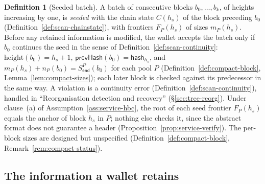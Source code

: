 \documentclass[11pt,a4paper]{article}
\theoremstyle{definition}
\newtheorem{definition}[theorem]{Definition}
\begin{document}
\begin{definition}[Seeded batch]\label{def:tree-seeded}
A batch of consecutive blocks $b_0, \dots, b_k$, of heights increasing by
one, is \emph{seeded} with the chain state $C(h_s)$ of the block preceding
$b_0$ (Definition~\ref{def:scan-chainstate}), with frontiers $F_P(h_s)$ of
sizes $m_P(h_s)$. Before any retained information is modified, the wallet
accepts the batch only if $b_0$ continues the seed in the sense of
Definition~\ref{def:scan-continuity}: $\mathrm{height}(b_0) = h_s + 1$,
$\mathsf{prevHash}(b_0) = \mathsf{hash}_{h_s}$, and
$m_P(h_s) + n_P(b_0) = S^{P}_{\mathsf{end}}(b_0)$ for each pool $P$
(Definition~\ref{def:compact-block}, Lemma~\ref{lem:compact-sizes}); each
later block is checked against its predecessor in the same way. A
violation is a continuity error (Definition~\ref{def:scan-continuity}),
handled in ``Reorganisation detection and recovery''
(\S\ref{sec:tree-reorg}). Under clause~(a) of
Assumption~\ref{ass:service-hbc}, the root of each seed frontier $F_P(h_s)$
equals the anchor of block $h_s$ in $P$; nothing else checks it, since the
abstract format does not guarantee a header
(Proposition~\ref{prop:service-verify}). The per-block sizes are designed
but unspecified (Definition~\ref{def:compact-block},
Remark~\ref{rem:compact-status}).
\end{definition}

\subsection{The information a wallet retains}\label{sec:tree-retained}
\end{document}
